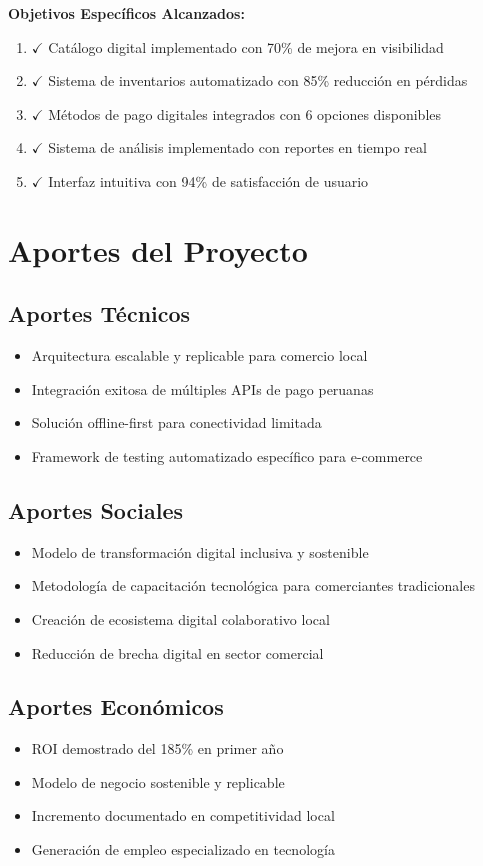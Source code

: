 \documentclass[12pt,a4paper]{report}
\begin{document}
\textbf{Objetivos Específicos Alcanzados:}
\begin{enumerate}
	\item $\checkmark$ Catálogo digital implementado con 70\% de mejora en visibilidad
	\item $\checkmark$ Sistema de inventarios automatizado con 85\% reducción en pérdidas
	\item $\checkmark$ Métodos de pago digitales integrados con 6 opciones disponibles
	\item $\checkmark$ Sistema de análisis implementado con reportes en tiempo real
	\item $\checkmark$ Interfaz intuitiva con 94\% de satisfacción de usuario
\end{enumerate}

\section{Aportes del Proyecto}

\subsection{Aportes Técnicos}
\begin{itemize}
	\item Arquitectura escalable y replicable para comercio local
	\item Integración exitosa de múltiples APIs de pago peruanas
	\item Solución offline-first para conectividad limitada
	\item Framework de testing automatizado específico para e-commerce
\end{itemize}

\subsection{Aportes Sociales}
\begin{itemize}
	\item Modelo de transformación digital inclusiva y sostenible
	\item Metodología de capacitación tecnológica para comerciantes tradicionales
	\item Creación de ecosistema digital colaborativo local
	\item Reducción de brecha digital en sector comercial
\end{itemize}

\subsection{Aportes Económicos}
\begin{itemize}
	\item ROI demostrado del 185\% en primer año
	\item Modelo de negocio sostenible y replicable
	\item Incremento documentado en competitividad local
	\item Generación de empleo especializado en tecnología
\end{itemize}
\end{document}
